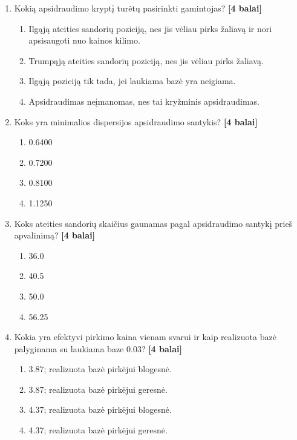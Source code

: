 \documentclass[11pt]{article}
\newcommand{\pts}[1]{\hspace{0.35em}\textnormal{\textbf{[#1 balai]}}}
\newenvironment{choices}{\begin{enumerate}[label=\Alph*.,leftmargin=2.2em,itemsep=0.12em,topsep=0.12em]}{\end{enumerate}}
\begin{document}
\begin{enumerate}
    \item Kokią apsidraudimo kryptį turėtų pasirinkti gamintojas? \pts{4}
    \begin{choices}
        \item Ilgąją ateities sandorių poziciją, nes jis vėliau pirks žaliavą ir
        nori apsisaugoti nuo kainos kilimo.
        \item Trumpąją ateities sandorių poziciją, nes jis vėliau pirks žaliavą.
        \item Ilgąją poziciją tik tada, jei laukiama bazė yra neigiama.
        \item Apsidraudimas neįmanomas, nes tai kryžminis apsidraudimas.
    \end{choices}

    \item Koks yra minimalios dispersijos apsidraudimo santykis? \pts{4}
    \begin{choices}
        \item 0.6400
        \item 0.7200
        \item 0.8100
        \item 1.1250
    \end{choices}

    \item Koks ateities sandorių skaičius gaunamas pagal apsidraudimo santykį
    prieš apvalinimą? \pts{4}
    \begin{choices}
        \item 36.0
        \item 40.5
        \item 50.0
        \item 56.25
    \end{choices}

    \item Kokia yra efektyvi pirkimo kaina vienam svarui ir kaip realizuota bazė
    palyginama su laukiama baze 0.03? \pts{4}
    \begin{choices}
        \item 3.87; realizuota bazė pirkėjui blogesnė.
        \item 3.87; realizuota bazė pirkėjui geresnė.
        \item 4.37; realizuota bazė pirkėjui blogesnė.
        \item 4.37; realizuota bazė pirkėjui geresnė.
    \end{choices}
\end{enumerate}
\end{document}
